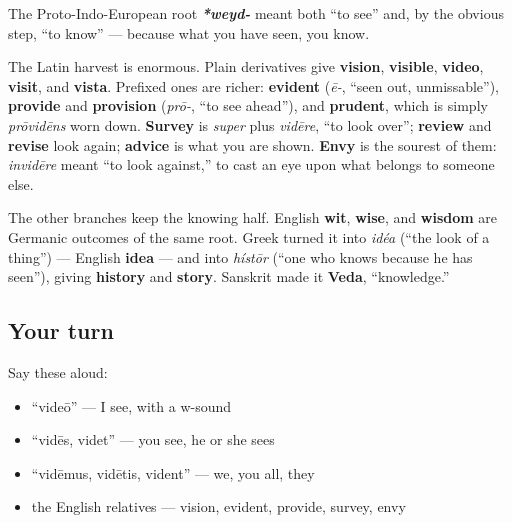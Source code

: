 \begin{cousinweb}
The Proto-Indo-European root \emph{\textbf{*weyd-}} meant both \textquotedblleft{}to see\textquotedblright{} and, by the obvious step, \textquotedblleft{}to know\textquotedblright{} — because what you have seen, you know.

The Latin harvest is enormous. Plain derivatives give \textbf{vision}, \textbf{visible}, \textbf{video}, \textbf{visit}, and \textbf{vista}. Prefixed ones are richer: \textbf{evident} (\emph{ē-}, \textquotedblleft{}seen out, unmissable\textquotedblright{}), \textbf{provide} and \textbf{provision} (\emph{prō-}, \textquotedblleft{}to see ahead\textquotedblright{}), and \textbf{prudent}, which is simply \emph{prōvidēns} worn down. \textbf{Survey} is \emph{super} plus \emph{vidēre}, \textquotedblleft{}to look over\textquotedblright{}; \textbf{review} and \textbf{revise} look again; \textbf{advice} is what you are shown. \textbf{Envy} is the sourest of them: \emph{invidēre} meant \textquotedblleft{}to look against,\textquotedblright{} to cast an eye upon what belongs to someone else.

The other branches keep the knowing half. English \textbf{wit}, \textbf{wise}, and \textbf{wisdom} are Germanic outcomes of the same root. Greek turned it into \emph{idéa} (\textquotedblleft{}the look of a thing\textquotedblright{}) — English \textbf{idea} — and into \emph{hístōr} (\textquotedblleft{}one who knows because he has seen\textquotedblright{}), giving \textbf{history} and \textbf{story}. Sanskrit made it \textbf{Veda}, \textquotedblleft{}knowledge.\textquotedblright{}
\end{cousinweb}

\subsection*{Your turn}
Say these aloud:

\begin{itemize}
\raggedright
  \item \textquotedblleft{}videō\textquotedblright{} — I see, with a w-sound
  \item \textquotedblleft{}vidēs, videt\textquotedblright{} — you see, he or she sees
  \item \textquotedblleft{}vidēmus, vidētis, vident\textquotedblright{} — we, you all, they
  \item the English relatives — vision, evident, provide, survey, envy
\end{itemize}

